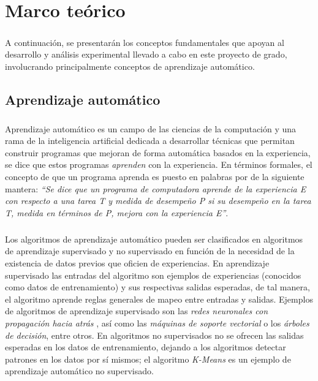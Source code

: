 \chapter{Marco teórico} \label{section-marco-teorico}

\paragraph{} A continuación, se presentarán los conceptos fundamentales que apoyan al desarrollo y análisis experimental llevado a cabo en este proyecto de grado, involucrando principalmente conceptos de aprendizaje automático.

\section{Aprendizaje automático}

\paragraph{}Aprendizaje automático es un campo de las ciencias de la computación y una rama de la inteligencia artificial dedicada a desarrollar técnicas que permitan construir programas que mejoran de forma automática basados en la experiencia, se dice que estos programas \textit{aprenden} con la experiencia. En términos formales, el concepto de que un programa aprenda es puesto en palabras por \citet{mitchell1997machine} de la siguiente mantera: \textit{“Se dice que un programa de computadora aprende de la experiencia E con respecto a una tarea T y medida de desempeño P si su desempeño en la tarea T, medida en términos de P, mejora con la experiencia E”}. 

\paragraph{}Los algoritmos de aprendizaje automático pueden ser clasificados en algoritmos de aprendizaje supervisado y no supervisado en función de la necesidad de la existencia de datos previos que oficien de experiencias. En aprendizaje supervisado las entradas del algoritmo son ejemplos de experiencias (conocidos como datos de entrenamiento) y sus respectivas salidas esperadas, de tal manera, el algoritmo aprende reglas generales de mapeo entre entradas y salidas. Ejemplos de algoritmos de aprendizaje supervisado son las \textit{redes neuronales con propagación hacia atrás} , así como las \textit{máquinas de soporte vectorial} o los \textit{árboles de decisión}, entre otros. En algoritmos no supervisados no se ofrecen las salidas esperadas en los datos de entrenamiento, dejando a los algoritmos detectar patrones en los datos por sí mismos; el algoritmo \textit{K-Means} es un ejemplo de aprendizaje automático no supervisado. 

